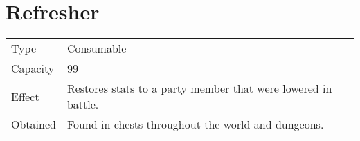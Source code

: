 \section{Refresher}
\label{item:refresher}


\noindent\begin{tabularx}{\textwidth}[l]{lX}
	Type
	& Consumable
\\ %
	Capacity
	& 99
\\ %
	Effect
	& Restores stats to a party member that were lowered in battle.
\\ %
	Obtained
	& Found in chests throughout the world and dungeons.
\end{tabularx}
